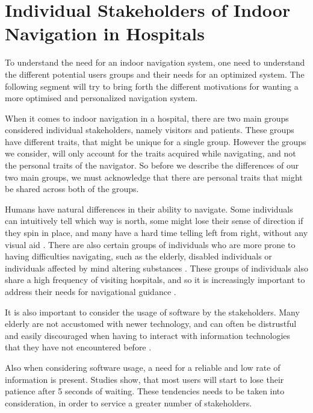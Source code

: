 \section{Individual Stakeholders of Indoor Navigation in Hospitals} %
\label{sec:interusers}

To understand the need for an indoor navigation system, one need to understand the different potential users groups and their needs for an optimized system. The following segment will try to bring forth the different motivations for wanting a more optimised and personalized navigation system.

When it comes to indoor navigation in a hospital, there are two main groups considered individual stakeholders, namely visitors and patients. These groups have different traits, that might be unique for a single group. However the groups we consider, will only account for the traits acquired while navigating, and not the personal traits of the navigator. So before we describe the differences of our two main groups, we must acknowledge that there are personal traits that might be shared across both of the groups.

Humans have natural differences in their ability to navigate. Some individuals can intuitively tell which way is north, some might lose their sense of direction if they spin in place, and many have a hard time telling left from right, without any visual aid \cite{naturtalenter}. There are also certain groups of individuals who are more prone to having difficulties navigating, such as the elderly, disabled individuals or individuals affected by mind altering substances \cite{MCI}. These groups of individuals also share a high frequency of visiting hospitals, and so it is increasingly important to address their needs for navigational guidance \cite{generel}.

It is also important to consider the usage of software by the stakeholders. Many elderly are not accustomed with newer technology, and can often be distrustful and easily discouraged when having to interact with information technologies that they have not encountered before \cite{gamle_teknologi}. 

Also when considering software usage, a need for a reliable and low rate of information is present. Studies show, that most users will start to lose their patience after 5 seconds of waiting\cite{ventetid}. These tendencies needs to be taken into consideration, in order to service a greater number of stakeholders.

